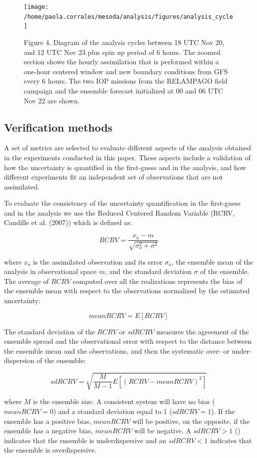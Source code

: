 \documentclass[final,5p,times,twocolumn,authoryear]{elsarticle} %
\begin{document}
\begin{figure}
\texttt{[image: /home/paola.corrales/mesoda/analysis/figures/analysis\_cycle]} \caption{Figure 4. Diagram of the analysis cycles between 18 UTC Nov 20, and 12 UTC Nov 23 plus spin up period of 6 hours. The zoomed section shows the hourly assimilation that is performed within a one-hour centered window and new boundary conditions from GFS every 6 hours. The two IOP missions from the RELAMPAGO field campaign and the ensemble forecast initialized at 00 and 06 UTC Nov 22 are shown.}\label{fig:cycle}
\end{figure}

\hypertarget{verification-methods}{%
\subsection{Verification methods}\label{verification-methods}}

A set of metrics are selected to evaluate different aspects of the analysis obtained in the experiments conducted in this paper. These aspects include a validation of how the uncertainty is quantified in the first-guess and in the analysis, and how different experiments fit an independent set of observations that are not assimilated.

To evaluate the consistency of the uncertainty quantification in the first-guess and in the analysis we use the Reduced Centered Random Variable (RCRV, Candille et al. (2007)) which is defined as:

\[RCRV = \frac{x_o - m}{\sqrt{\sigma_o^2 + \sigma^2}}\]

where \(x_o\) is the assimilated observation and its error \(\sigma_o\), the ensemble mean of the analysis in observational space \(m\), and the standard deviation \(\sigma\) of the ensemble.
The average of \(RCRV\) computed over all the realizations represents the bias of the ensemble mean with respect to the observations normalized by the estimated uncertainty:

\[\mathit{mean RCRV} = E[RCRV]\]

The standard deviation of the \(RCRV\) or \(sd RCRV\) measures the agreement of the ensemble spread and the observational error with respect to the distance between the ensemble mean and the observations, and then the systematic over- or under- dispersion of the ensemble:

\[\mathit{sd RCRV} = \sqrt{\frac{M}{M -1}E[(\mathit{RCRV} - \mathit{mean RCRV})^2]}\]

where \(M\) is the ensemble size. A consistent system will have no bias (\(mean RCRV = 0\)) and a standard deviation equal to 1 (\(sd RCRV = 1\)). If the ensemble has a positive bias, \(mean RCRV\) will be positive, on the opposite, if the ensemble has a negative bias, \(mean RCRV\) will be negative. A \(sd RCRV > 1\) () indicates that the ensemble is underdispersive and an \(sd RCRV < 1\) indicates that the ensemble is overdispersive.
\end{document}
